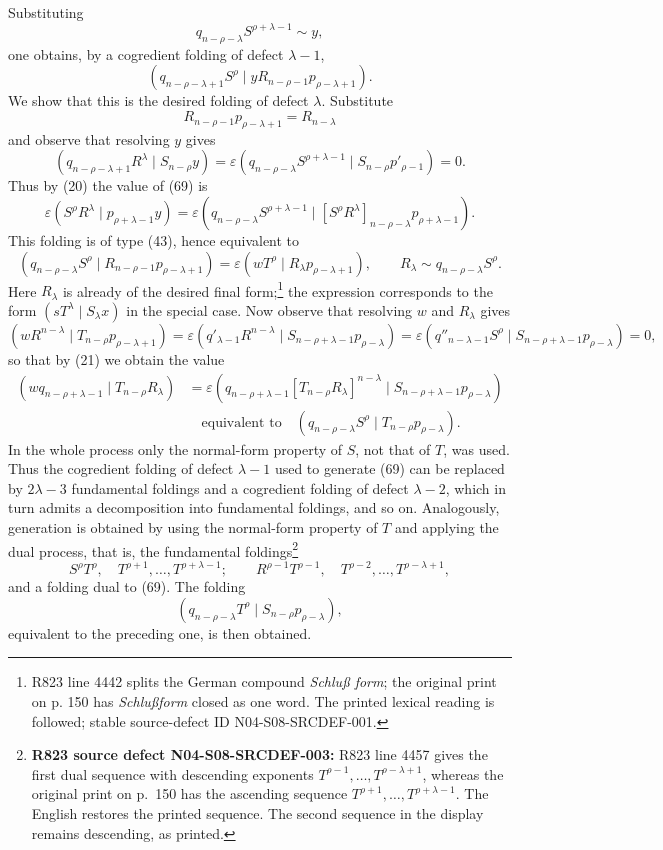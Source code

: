 \documentclass[10pt]{article}
\newcommand{\pair}[2]{(#1\mid #2)}
\newcommand{\eps}{\varepsilon}
\begin{document}
Substituting
\[
 q_{n-\rho-\lambda}S^{\rho+\lambda-1}\sim y,
\]
one obtains, by a cogredient folding of defect $\lambda-1$,
\begin{equation}
 \pair{q_{n-\rho-\lambda+1}S^\rho}
 {yR_{n-\rho-1}p_{\rho-\lambda+1}}.
\tag{69}
\end{equation}
We show that this is the desired folding of defect $\lambda$. Substitute
\[
 R_{n-\rho-1}p_{\rho-\lambda+1}=R_{n-\lambda}
\]
and observe that resolving $y$ gives
\[
 \pair{q_{n-\rho-\lambda+1}R^\lambda}{S_{n-\rho}y}
 =\eps\pair{q_{n-\rho-\lambda}S^{\rho+\lambda-1}}
 {S_{n-\rho}p'_{\rho-1}}=0.
\]
Thus by (20) the value of (69) is
\[
 \eps\pair{S^\rho R^\lambda}{p_{\rho+\lambda-1}y}
 =\eps\pair{q_{n-\rho-\lambda}S^{\rho+\lambda-1}}
 {[S^\rho R^\lambda]_{n-\rho-\lambda}p_{\rho+\lambda-1}}.
\]
This folding is of type (43), hence equivalent to
\[
 \pair{q_{n-\rho-\lambda}S^\rho}
 {R_{n-\rho-1}p_{\rho-\lambda+1}}
 =\eps\pair{wT^\rho}{R_\lambda p_{\rho-\lambda+1}},
 \qquad R_\lambda\sim q_{n-\rho-\lambda}S^\rho.
\]
Here $R_\lambda$ is already of the desired final form;\footnote{R823 line
4442 splits the German compound \emph{Schlu\ss{} form}; the original print on
p. 150 has \emph{Schlu\ss{}form} closed as one word. The printed lexical
reading is followed; stable source-defect ID N04-S08-SRCDEF-001.} the
expression corresponds to the form $\pair{sT^\lambda}{S_\lambda x}$ in the
special case. Now observe that resolving $w$ and $R_\lambda$ gives
\[
 \pair{wR^{n-\lambda}}{T_{n-\rho}p_{\rho-\lambda+1}}
 =\eps\pair{q'_{\lambda-1}R^{n-\lambda}}
 {S_{n-\rho+\lambda-1}p_{\rho-\lambda}}
 =\eps\pair{q''_{n-\lambda-1}S^\rho}
 {S_{n-\rho+\lambda-1}p_{\rho-\lambda}}=0,
\]
so that by (21) we obtain the value
\[
\begin{aligned}
 \pair{wq_{n-\rho+\lambda-1}}{T_{n-\rho}R_\lambda}
 &=\eps\pair{q_{n-\rho+\lambda-1}[T_{n-\rho}R_\lambda]^{n-\lambda}}
 {S_{n-\rho+\lambda-1}p_{\rho-\lambda}}\\
 &\quad\text{equivalent to}\quad
 \pair{q_{n-\rho-\lambda}S^\rho}{T_{n-\rho}p_{\rho-\lambda}}.
\end{aligned}
\]
In the whole process only the normal-form property of $S$, not that of $T$,
was used. Thus the cogredient folding of defect $\lambda-1$ used to generate
(69) can be replaced by $2\lambda-3$ fundamental foldings and a cogredient
folding of defect $\lambda-2$, which in turn admits a decomposition into
fundamental foldings, and so on. Analogously, generation is obtained by
using the normal-form property of $T$ and applying the dual process, that
is, the fundamental foldings\footnote{\textbf{R823 source defect
N04-S08-SRCDEF-003:} R823 line 4457 gives the first dual sequence with
descending exponents $T^{\rho-1},\ldots,T^{\rho-\lambda+1}$, whereas the
original print on p.~150 has the ascending sequence
$T^{\rho+1},\ldots,T^{\rho+\lambda-1}$. The English restores the printed
sequence. The second sequence in the display remains descending, as printed.}
\[
 S^\rho T^\rho,\quad T^{\rho+1},\ldots,T^{\rho+\lambda-1};
 \qquad R^{\rho-1}T^{\rho-1},\quad
 T^{\rho-2},\ldots,T^{\rho-\lambda+1},
\]
and a folding dual to (69). The folding
\[
 \pair{q_{n-\rho-\lambda}T^\rho}{S_{n-\rho}p_{\rho-\lambda}},
\]
equivalent to the preceding one, is then obtained.
\end{document}

